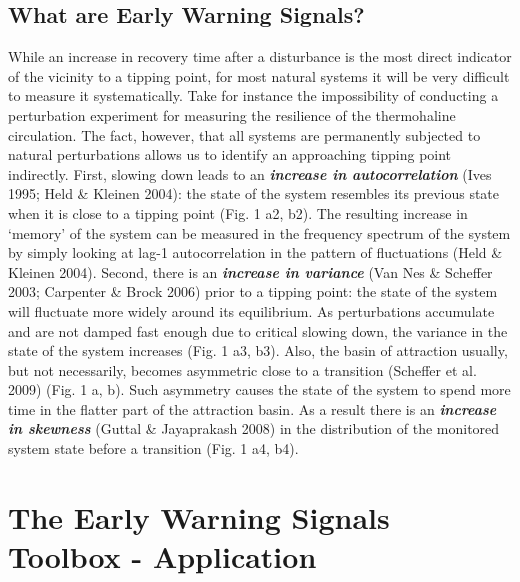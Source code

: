 \documentclass[12pt,a4paper,final]{article}
\begin{document}
\subsection{What are Early Warning Signals?}
While an increase in recovery time after a disturbance is the most direct indicator of the vicinity to a tipping point, for most natural systems it will be very difficult to measure it systematically. Take for instance the impossibility of conducting a perturbation experiment for measuring the resilience of the thermohaline circulation. The fact, however, that all systems are permanently subjected to natural perturbations allows us to identify an approaching tipping point indirectly. First, slowing down leads to an \textit{\textbf{increase in autocorrelation}} (Ives 1995; Held \& Kleinen 2004): the state of the system resembles its previous state when it is close to a tipping point (Fig. 1 a2, b2). The resulting increase in `memory' of the system can be measured in the frequency spectrum of the system by simply looking at lag-1 autocorrelation in the pattern of fluctuations (Held \& Kleinen 2004). Second, there is an \textit{\textbf{increase in variance}} (Van Nes \& Scheffer 2003; Carpenter \& Brock 2006) prior to a tipping point: the state of the system will fluctuate more widely around its equilibrium. As perturbations accumulate and are not damped fast enough due to critical slowing down, the variance in the state of the system increases (Fig. 1 a3, b3). Also, the basin of attraction usually, but not necessarily, becomes asymmetric close to a transition (Scheffer et al. 2009) (Fig. 1 a, b). Such asymmetry causes the state of the system to spend more time in the flatter part of the attraction basin. As a result there is an \textit{\textbf{increase in skewness}} (Guttal \& Jayaprakash 2008) in the distribution of the monitored system state before a transition (Fig. 1 a4, b4).

\section{The Early Warning Signals Toolbox - Application}
\end{document}
